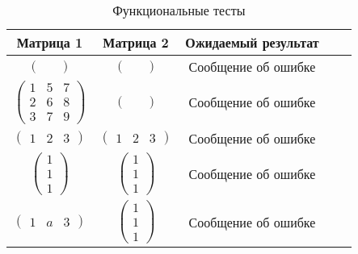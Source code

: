 \begin{table}[h]
	\begin{center}
		\caption{\label{tab:tests} Функциональные тесты}
		\begin{tabular}{|c|c|c|c|c|}
		\hline
		Матрица 1 & Матрица 2 & Ожидаемый результат \\ 
		\hline

		$\begin{pmatrix}
			&
		\end{pmatrix}$ &
		$\begin{pmatrix}
			&
		\end{pmatrix}$ &
		Сообщение об ошибке \\ \hline
			
		$\begin{pmatrix}
			1 & 5 & 7\\
			2 & 6 & 8\\
			3 & 7 & 9
		\end{pmatrix}$ &
		$\begin{pmatrix}
			&
		\end{pmatrix}$ &
		Сообщение об ошибке \\ \hline

		$\begin{pmatrix}
			1 & 2 & 3
		\end{pmatrix}$ &
		$\begin{pmatrix}
			1 & 2 & 3
		\end{pmatrix}$ &
		Сообщение об ошибке \\ \hline

		$\begin{pmatrix}
			1 \\
			1 \\
			1
		\end{pmatrix}$ &
		$\begin{pmatrix}
			1 \\
			1 \\
			1
		\end{pmatrix}$ &
		Сообщение об ошибке \\ \hline

		$\begin{pmatrix}
			1 & a & 3
		\end{pmatrix}$ &
		$\begin{pmatrix}
			1 \\
			1 \\
			1
		\end{pmatrix}$ &
		Сообщение об ошибке \\ \hline
			

\end{tabular}
\end{center}
\end{table}
